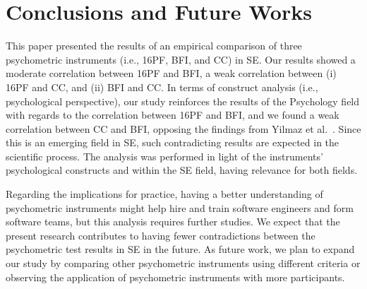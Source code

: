 \section{Conclusions and Future Works}
\label{CONCLUSIONS AND FUTURE WORKS}

This paper presented the results of an empirical comparison of three psychometric instruments (i.e., 16PF, BFI, and CC) in SE. Our results showed a moderate correlation between 16PF and BFI, a weak correlation between (i) 16PF and CC, and (ii) BFI and CC. In terms of construct analysis (i.e., psychological perspective), our study reinforces the results of the Psychology field with regards to the correlation between 16PF and BFI, and we found a weak correlation between CC and BFI, opposing the findings from Yilmaz et al.~\cite{yilmaz2017examination}. Since this is an emerging field in SE, such contradicting results are expected in the scientific process. The analysis was performed in light of the instruments' psychological constructs and within the SE field, having relevance for both fields.

Regarding the implications for practice, having a better understanding of psychometric instruments might help hire and train software engineers and form software teams, but this analysis requires further studies. We expect that the present research contributes to having fewer contradictions between the psychometric test results in SE in the future. As future work, we plan to expand our study by comparing other psychometric instruments using different criteria or observing the application of psychometric instruments with more participants. 